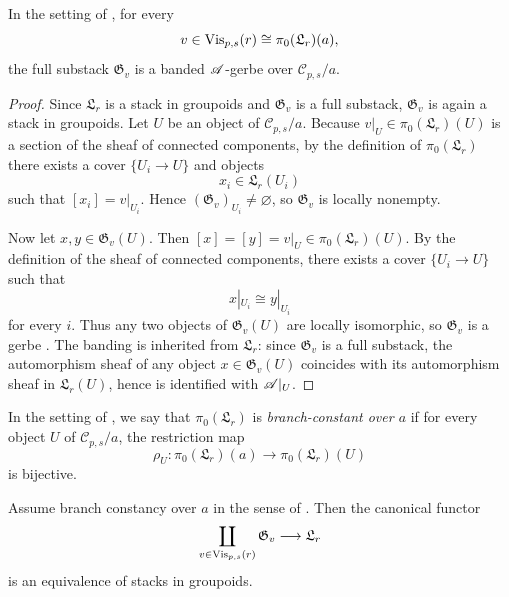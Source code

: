 \begin{theorem}\label{thm:component-gerbe-decomposition}
In the setting of , for every
\[
v\in \mathrm{Vis}_{p,s}(r)\cong \pi_0(\mathfrak L_r)(a),
\]
the full substack $\mathfrak G_v$ is a banded $\mathscr{A}$-gerbe over $\mathcal C_{p,s}/a$.
\end{theorem}

\begin{proof}
Since $\mathfrak L_r$ is a stack in groupoids and $\mathfrak G_v$ is a full substack, $\mathfrak G_v$ is again a stack in groupoids. Let $U$ be an object of $\mathcal C_{p,s}/a$. Because $v|_U\in \pi_0(\mathfrak L_r)(U)$ is a section of the sheaf of connected components, by the definition of $\pi_0(\mathfrak L_r)$ there exists a cover $\{U_i\to U\}$ and objects
\[
x_i\in \mathfrak L_r(U_i)
\]
such that $[x_i]=v|_{U_i}$. Hence $(\mathfrak G_v)_{U_i}\neq\varnothing$, so $\mathfrak G_v$ is locally nonempty.

Now let $x,y\in \mathfrak G_v(U)$. Then $[x]=[y]=v|_U\in \pi_0(\mathfrak L_r)(U)$. By the definition of the sheaf of connected components, there exists a cover $\{U_i\to U\}$ such that
\[
x|_{U_i}\cong y|_{U_i}
\]
for every $i$. Thus any two objects of $\mathfrak G_v(U)$ are locally isomorphic, so $\mathfrak G_v$ is a gerbe \cite[Tag 06NY]{StacksProject}. The banding is inherited from $\mathfrak L_r$: since $\mathfrak G_v$ is a full substack, the automorphism sheaf of any object $x\in \mathfrak G_v(U)$ coincides with its automorphism sheaf in $\mathfrak L_r(U)$, hence is identified with $\mathscr{A}|_U$.
\end{proof}

\begin{definition}\label{def:branch-constancy}
In the setting of , we say that $\pi_0(\mathfrak L_r)$ is \emph{branch-constant over $a$} if for every object $U$ of $\mathcal C_{p,s}/a$, the restriction map
\[
\rho_U:\pi_0(\mathfrak L_r)(a)\longrightarrow \pi_0(\mathfrak L_r)(U)
\]
is bijective.
\end{definition}

\begin{corollary}\label{cor:branch-decomposition}
Assume branch constancy over $a$ in the sense of . Then the canonical functor
\[
\coprod_{v\in \mathrm{Vis}_{p,s}(r)} \mathfrak G_v\longrightarrow \mathfrak L_r
\]
is an equivalence of stacks in groupoids.
\end{corollary}

